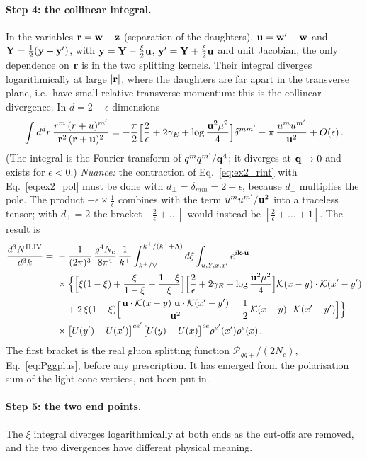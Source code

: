\paragraph{Step 4: the collinear integral.} In the variables $\mathbf{r}=\mathbf{w}-\mathbf{z}$ (separation of the daughters), $\mathbf{u}=\mathbf{w}'-\mathbf{w}$ and $\mathbf{Y}=\frac12(\mathbf{y}+\mathbf{y}')$, with $\mathbf{y}=\mathbf{Y}-\frac\xi2\mathbf{u}$, $\mathbf{y}'=\mathbf{Y}+\frac\xi2\mathbf{u}$ and unit Jacobian, the only dependence on $\mathbf{r}$ is in the two splitting kernels. Their integral diverges logarithmically at large $|\mathbf{r}|$, where the daughters are far apart in the transverse plane, i.e.\ have small relative transverse momentum: this is the collinear divergence. In $d=2-\epsilon$ dimensions
\begin{align}\label{eq:ex2_rint}
\int d^dr\,\frac{r^m\,(r+u)^{m'}}{\mathbf{r}^2\,(\mathbf{r}+\mathbf{u})^2}
=-\frac\pi2\Big[\frac2\epsilon+2\gamma_E+\log\frac{\mathbf{u}^2\mu^2}{4}\Big]\delta^{mm'}-\pi\,\frac{u^mu^{m'}}{\mathbf{u}^2}+O(\epsilon)\,.
\end{align}
(The integral is the Fourier transform of $q^mq^{m'}/\mathbf{q}^4$; it diverges at $\mathbf{q}\to0$ and exists for $\epsilon<0$.) \emph{Nuance:} the contraction of Eq.~\eqref{eq:ex2_rint} with Eq.~\eqref{eq:ex2_pol} must be done with $d_\perp=\delta_{mm}=2-\epsilon$, because $d_\perp$ multiplies the pole. The product $-\epsilon\times\frac1\epsilon$ combines with the term $u^mu^{m'}/\mathbf{u}^2$ into a traceless tensor; with $d_\perp=2$ the bracket $[\frac2\epsilon+\dots]$ would instead be $[\frac2\epsilon+\dots+1]$. The result is
\begin{align}\label{eq:ex2_contr}
\frac{d^3N^{\rm II.IV}}{d^3k}=\ &-\frac{1}{(2\pi)^3}\,\frac{g^4N_c}{8\pi^4}\,\frac{1}{k^+}\int_{k^+/\vee}^{k^+/(k^++\Lambda)}d\xi\int_{u,Y,x,x'}e^{i\v k\cdot\v u}\notag\\
&\times\Big\{\Big[\xi(1-\xi)+\frac{\xi}{1-\xi}+\frac{1-\xi}{\xi}\Big]\Big[\frac2\epsilon+2\gamma_E+\log\frac{\v u^2\mu^2}{4}\Big]\Kv(x-y)\cdot\Kv(x'-y')\notag\\
&\quad+2\,\xi(1-\xi)\Big[\frac{\v u\cdot\Kv(x-y)\;\v u\cdot\Kv(x'-y')}{\v u^2}-\frac12\,\Kv(x-y)\cdot\Kv(x'-y')\Big]\Big\}\notag\\
&\times\big[U(y')-U(x')\big]^{ce'}\big[U(y)-U(x)\big]^{ce}\rho^{e'}(x')\rho^e(x)\,.
\end{align}
The first bracket is the real gluon splitting function $\mathcal P_{gg+}/(2N_c)$, Eq.~\eqref{eq:Pggplus}, before any prescription. It has emerged from the polarisation sum of the light-cone vertices, not been put in.

\paragraph{Step 5: the two end points.} The $\xi$ integral diverges logarithmically at both ends as the cut-offs are removed, and the two divergences have different physical meaning.

